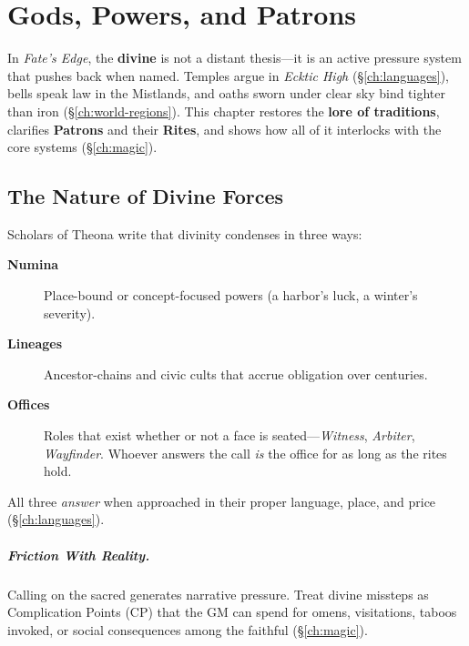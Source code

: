 
\chapter{Gods, Powers, and Patrons}
\label{ch:gods-powers-patrons}

\begin{multicols}{2}

In \textit{Fate’s Edge}, the \textbf{divine} is not a distant thesis—it is an active pressure system that pushes back when named. Temples argue in \emph{Ecktic High} (\S\ref{ch:languages}), bells speak law in the Mistlands, and oaths sworn under clear sky bind tighter than iron (\S\ref{ch:world-regions}). This chapter restores the \textbf{lore of traditions}, clarifies \textbf{Patrons} and their \textbf{Rites}, and shows how all of it interlocks with the core systems (\S\ref{ch:magic}).

\section{The Nature of Divine Forces}
Scholars of Theona write that divinity condenses in three ways:
\begin{description}
  \item[\textbf{Numina}]  Place-bound or concept-focused powers (a harbor’s luck, a winter’s severity).
  \item[\textbf{Lineages}]  Ancestor-chains and civic cults that accrue obligation over centuries.
  \item[\textbf{Offices}]  Roles that exist whether or not a face is seated—\emph{Witness}, \emph{Arbiter}, \emph{Wayfinder}. Whoever answers the call \emph{is} the office for as long as the rites hold.
\end{description}
All three \emph{answer} when approached in their proper language, place, and price (\S\ref{ch:languages}).

\paragraph{Friction With Reality.}
Calling on the sacred generates narrative pressure. Treat divine missteps as Complication Points (CP) that the GM can spend for omens, visitations, taboos invoked, or social consequences among the faithful (\S\ref{ch:magic}).


\end{multicols}
